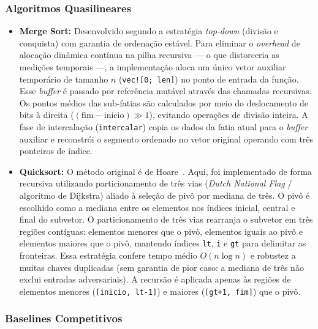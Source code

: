 \documentclass[portuguese]{sbc2025}%
\begin{document}
\subsubsection{Algoritmos Quasilineares}

\begin{itemize}
    \item \textbf{Merge Sort:} Desenvolvido segundo a estratégia \emph{top-down} (divisão e conquista) com garantia de ordenação estável. Para eliminar o \emph{overhead} de alocação dinâmica contínua na pilha recursiva — o que distorceria as medições temporais —, a implementação aloca um único vetor auxiliar temporário de tamanho $n$ (\texttt{vec![0; len]}) no ponto de entrada da função. Esse \emph{buffer} é passado por referência mutável através das chamadas recursivas. Os pontos médios das sub-fatias são calculados por meio do deslocamento de bits à direita ($(\text{fim} - \text{inicio}) \gg 1$), evitando operações de divisão inteira. A fase de intercalação (\texttt{intercalar}) copia os dados da fatia atual para o \emph{buffer} auxiliar e reconstrói o segmento ordenado no vetor original operando com três ponteiros de índice.

    \item \textbf{Quicksort:} O método original é de Hoare~\citep{hoare_quicksort_1962}. Aqui, foi implementado de forma recursiva utilizando particionamento de três vias (\emph{Dutch National Flag} / algoritmo de Dijkstra) aliado à seleção de pivô por mediana de três. O pivô é escolhido como a mediana entre os elementos nos índices inicial, central e final do subvetor. O particionamento de três vias rearranja o subvetor em três regiões contíguas: elementos menores que o pivô, elementos iguais ao pivô e elementos maiores que o pivô, mantendo índices \texttt{lt}, \texttt{i} e \texttt{gt} para delimitar as fronteiras. Essa estratégia confere tempo médio $O(n \log n)$ e robustez a muitas chaves duplicadas (sem garantia de pior caso: a mediana de três não exclui entradas adversariais). A recursão é aplicada apenas às regiões de elementos menores (\texttt{[inicio, lt-1]}) e maiores (\texttt{[gt+1, fim]}) que o pivô.
\end{itemize}

\subsubsection{Baselines Competitivos}
\end{document}
